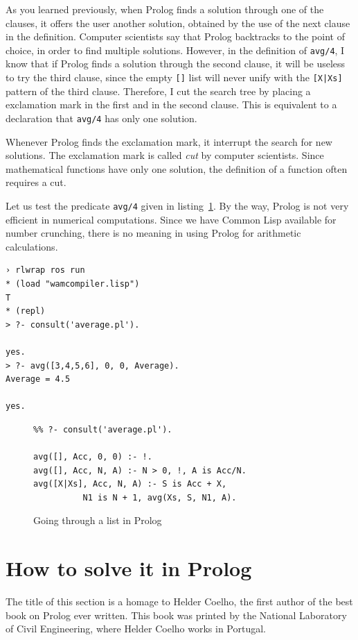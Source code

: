 \documentclass[a4paper,12pt]{book}
\newenvironment{fmpage}[1]
           {\begin{lrbox}{\fmbox}\begin{minipage}{#1}}
           {\end{minipage}\end{lrbox}\fbox{\usebox{\fmbox}}}
\begin{document}
As you learned previously, when Prolog finds a solution through
one of the clauses, it offers the user another solution, obtained
by the use of the next clause in the definition. Computer scientists
say that Prolog backtracks to the point of choice, in order
to find multiple solutions. However, in the definition of
\verb|avg/4|, I know that if Prolog finds a solution through
the second clause, it will be useless to try the third
clause, since the empty \verb|[]| list will never unify
with the \verb/[X|Xs]/ pattern of the third clause. Therefore,
I cut the search tree by placing a exclamation mark
in the first and in the second clause. This is equivalent
to a declaration that \verb|avg/4| has only one solution.

Whenever Prolog finds the exclamation mark, it interrupt
the search for new solutions. The exclamation mark is
called {\em cut} by computer scientists. Since mathematical
functions have only one solution, the definition of a function
often requires a cut.

\pagebreak
Let us test the predicate \verb|avg/4| given in
listing~\ref{prolog:average}. By the way, Prolog
is not very efficient in numerical computations.
Since we have Common Lisp available for number
crunching, there is no meaning in using Prolog
for arithmetic calculations.

\begin{verbatim}
› rlwrap ros run
* (load "wamcompiler.lisp")
T
* (repl)
> ?- consult('average.pl').

yes.
> ?- avg([3,4,5,6], 0, 0, Average).
Average = 4.5

yes.
\end{verbatim}

\begin{figure}[!h]
\begin{fmpage}{0.9\textwidth}
\begin{verbatim}
%% ?- consult('average.pl').

avg([], Acc, 0, 0) :- !.
avg([], Acc, N, A) :- N > 0, !, A is Acc/N.
avg([X|Xs], Acc, N, A) :- S is Acc + X,
          N1 is N + 1, avg(Xs, S, N1, A).
\end{verbatim}
\end{fmpage}
\caption{Going through a list in Prolog}
\label{prolog:average}
\end{figure}

\section{How to solve it in Prolog}
The title of this section is a homage to Helder
Coelho, the first author of the best book on
Prolog ever written. This book was printed by
the National Laboratory of Civil Engineering, where
Helder Coelho works in Portugal. 
\end{document}
